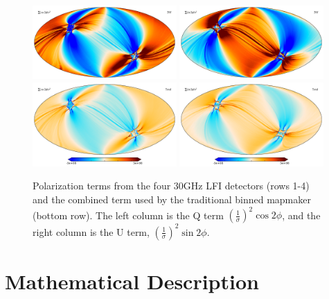 \documentclass{aa}
\begin{document}
\begin{figure}
  \includegraphics[width=0.49\textwidth]{figs/map_Q_polang28S.pdf}
  \includegraphics[width=0.49\textwidth]{figs/map_U_polang28S.pdf}\\
  \includegraphics[width=0.49\textwidth]{figs/map_Q_polang_all.pdf}
  \includegraphics[width=0.49\textwidth]{figs/map_U_polang_all.pdf}\\
  \caption{Polarization terms from the four 30GHz LFI detectors (rows 1-4) and the combined term used by the traditional binned mapmaker (bottom row). The left column is the Q term $(\frac{1}{\sigma})^2\cos2\phi$, and the right column is the U term, $(\frac{1}{\sigma})^2\sin2\phi$.}
  \label{fig:polangles}
\end{figure}

\section{Mathematical Description}
\label{sec:mapmaking}
\end{document}
